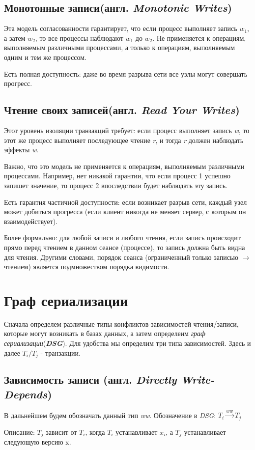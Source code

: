 \documentclass[12pt,  openany]{book}
\begin{document}
\subsection{Монотонные записи(англ.  \textit{Monotonic Writes})}
Эта модель согласованности гарантирует, что если процесс выполняет запись $w_1$,  а затем $w_2$, то все процессы наблюдают $w_1$ до $w_2$. Не применяется к операциям, выполняемым различными процессами, а только к  операциям, выполняемым одним и тем же процессом.
\par
Есть полная доступность: даже во время разрыва сети все узлы могут совершать прогресс.

\subsection{Чтение своих записей(англ.  \textit{Read Your Writes})}
Этот уровень изоляции транзакций требует: если процесс выполняет запись \textit{w}, то этот же процесс выполняет последующее чтение \textit{r}, и тогда \textit{r} должен наблюдать эффекты \textit{w}.
\par
Важно, что это модель не применяется к операциям, выполняемым различными процессами. Например, нет никакой гарантии, что если процесс 1 успешно запишет значение, то процесс 2 впоследствии будет наблюдать эту запись.
\par
Есть гарантия частичной доступности: если возникает разрыв сети, каждый узел может добиться прогресса (если клиент никогда не меняет сервер, с которым он взаимодействует).
\par
Более формально: для любой записи и любого чтения, если запись происходит прямо перед чтением в данном сеансе (процессе), то запись должна быть видна для чтения. Другими словами, порядок сеанса (ограниченный только записью $\rightarrow$ чтением) является подмножеством порядка видимости.

\section{Граф сериализации \cite{IsolationLevelDefinitions} \cite{IsolationLevelDefinitions2}}
Сначала определем различные типы конфликтов-зависимостей чтения/записи, которые могут возникать в базах данных, а затем определеим \textit{граф сериализации}(\textit{\textbf{DSG}}). Для удобства мы определим три типа зависимостей.
Здесь и далее $T_i/T_j$ - транзакции.
\subsection{Зависимость записи (англ. \textit{Directly Write-Depends})}
В дальнейшем будем обозначать данный тип \textit{ww}. Обозначение в \textit{DSG}: $T_i  \xrightarrow{\textit{ww}} T_j$
\par
Описание: $T_j$ зависит от $T_i$, когда $T_i$ устанавливает $x_i$, а $T_j$ устанавливает следующую версию x.
\end{document}
